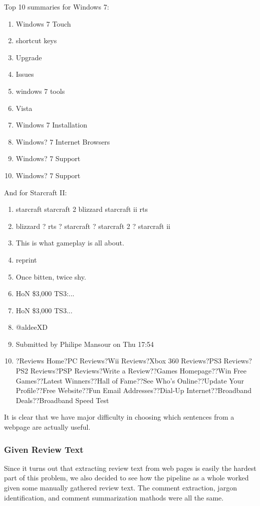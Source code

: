 \documentclass{article}
\begin{document}
Top 10 summaries for Windows 7:
\begin{enumerate}
\item Windows 7 Touch
\item shortcut keys
\item Upgrade
\item Issues
\item windows 7 tools
\item Vista
\item Windows 7 Installation
\item Windows? 7 Internet Browsers
\item Windows? 7 Support
\item Windows? 7 Support
\end{enumerate}

And for Starcraft II:
\begin{enumerate}
\item starcraft
  starcraft 2
  blizzard
  starcraft ii
  rts
\item blizzard ? rts ? starcraft ? starcraft 2 ? starcraft ii
\item This is what gameplay is all about.
\item reprint
\item Once bitten, twice shy.
\item HoN \$3,000 TS3:...
\item HoN \$3,000 TS3...
\item @aldeeXD
\item Submitted by Philipe Mansour on Thu 17:54
\item?Reviews Home?PC Reviews?Wii Reviews?Xbox 360 Reviews?PS3 Reviews?PS2 Reviews?PSP Reviews?Write a Review??Games Homepage??Win Free Games??Latest Winners??Hall of Fame??See Who's Online??Update Your Profile??Free Website??Fun Email Addresses??Dial-Up Internet??Broadband Deals??Broadband Speed Test
\end{enumerate}

It is clear that we have major difficulty in choosing which sentences from a
webpage are actually useful.

\subsubsection{Given Review Text}

Since it turns out that extracting review text from web pages is easily the
hardest part of this problem, we also decided to see how the pipeline as a whole
worked given some manually gathered review text. The comment extraction,
jargon identification, and comment summarization mathods were all the same.
\end{document}
